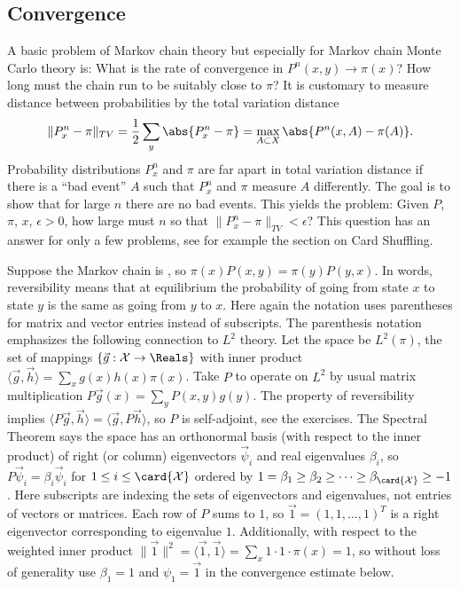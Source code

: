 \documentclass[12pt]{article}
\begin{document}
\subsection*{Convergence} A basic problem of Markov chain theory but
especially for Markov chain Monte Carlo theory is:  What is the rate of
convergence in \( P^n(x,y) \to \pi(x) \)? How long must the chain run to
be suitably close to \( \pi \)?  It is customary to measure distance
between probabilities by the total variation distance
\[
    \|P^n_x - \pi\|_{TV} = \frac{1}{2} \sum\limits_y \abs{ P^n_x - \pi }
    = \max_{A\subset X} \abs{ P^n(x,A) - \pi(A) }.
\] Probability distributions \( P^n_{x} \) and \( \pi \) are far apart
in total variation distance if there is a ``bad event'' \( A \) such
that \( P^n_{x} \) and \( \pi \) measure \( A \) differently. The goal
is to show that for large \( n \) there are no bad events. This yields
the problem:  Given \( P \), \( \pi \), \( x \), \( \epsilon > 0 \), how
large must \( n \) so that \( \| P^n_x - \pi \|_{TV} < \epsilon \)? This
question has an answer for only a few problems, see for example the
section on Card Shuffling.

Suppose the Markov chain is , so \( \pi(x) P(x,y)
= \pi(y) P(y,x) \).%
In words, reversibility means that at equilibrium the probability of
going from state \( x \) to state \( y \) is the same as going from \( y
\) to \( x \).  Here again the notation uses parentheses for matrix and
vector entries instead of subscripts.  The parenthesis notation
emphasizes the following connection to \( L^2 \) theory.  Let the space
be \( L^2(\pi) \), the set of mappings \( \{\vec{g} : \mathcal{X} \to
\Reals \} \) with inner product \( \langle \vec{g},\vec{h} \rangle =
\sum_{x}g(x) h(x) \pi(x) \). Take \( P \) to operate on \( L^2 \) by
usual matrix multiplication \( P\vec{g}(x) = \sum_y P(x,y) g(y) \).  The
property of reversibility implies \( \langle P\vec{g},\vec{h} \rangle =
\langle \vec{g},P \vec{h} \rangle \), so \( P \) is self-adjoint, see
the exercises.  The Spectral Theorem says the space has an orthonormal
basis (with respect to the inner product) of right (or column)
eigenvectors \( \vec{\psi}_i \) and real eigenvalues \( \beta_i \), so \(
P\vec{\psi}_i = \beta_i \vec{\psi}_i \) for \( 1 \le i \le \card{\mathcal
{X}} \) ordered by \( 1 = \beta_1 \ge \beta_2 \ge \cdots \ge \beta_{\card
{\mathcal{X}}} \ge -1 \).  Here subscripts are indexing the sets of
eigenvectors and eigenvalues, not entries of vectors or matrices.  Each
row of \( P \) sums to \( 1 \), so \( \vec{1} = (1,1, \dots, 1)^T \) is
a right eigenvector corresponding to eigenvalue \( 1 \).  Additionally,
with respect to the weighted inner product \( \| \vec{1} \|^{2} =
\langle \vec{1}, \vec{1} \rangle = \sum_{x} 1 \cdot 1 \cdot \pi(x) = 1 \),
so without loss of generality use \( \beta_1 = 1 \) and \( \psi_1 = \vec
{1} \) in the convergence estimate below.
\end{document}
